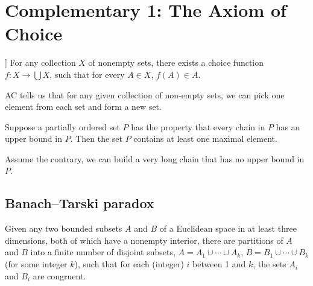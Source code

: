 \chapter*{Complementary 1: The Axiom of Choice} \label{sec:}


\begin{axiom}[The Axiom of Choice [AC]]
 \normalfont For any collection $X$ of nonempty sets, there exists a choice function $f: X \to \bigcup X $, such that for every $A \in X$, $f(A) \in A$.
\end{axiom}

\begin{thmintuition}
    AC tells us that for any given collection of non-empty sets, we can pick one element from each set and form a new set.
\end{thmintuition}

\begin{corollary} 
 \normalfont Suppose a partially ordered set $P$ has the property that every chain in $P$ has an upper bound in $P$. Then the set $P$ contains at least one maximal element.
\end{corollary}
\begin{proofidea}
    Assume the contrary, we can build a very long chain that has no upper bound in $P$.
\end{proofidea}


\section*{Banach–Tarski paradox} \label{sec:}

\begin{corollary}
 \normalfont Given any two bounded subsets $A$ and $B$ of a Euclidean space in at least three dimensions, both of which have a nonempty interior, there are partitions of $A$ and $B$ into a finite number of disjoint subsets, $A = A_1 \cup \cdots \cup A_k$, $B = B_1 \cup \cdots \cup B_k$ (for some integer $k$), such that for each (integer) $i$ between 1 and $k$, the sets $A_i$ and $B_i$ are congruent.
\end{corollary}

